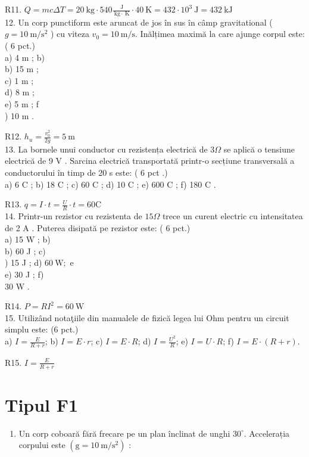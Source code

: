 R11. $Q=m c \Delta T=20 \mathrm{~kg} \cdot 540 \frac{\mathrm{~J}}{\mathrm{~kg} \cdot \mathrm{~K}} \cdot 40 \mathrm{~K}=432 \cdot 10^{3} \mathrm{~J}=432 \mathrm{~kJ}$\\
12. Un corp punctiform este aruncat de jos în sus în câmp gravitational ( $g=10 \mathrm{~m} / \mathrm{s}^{2}$ ) cu viteza $v_{0}=10 \mathrm{~m} / \mathrm{s}$. Inălțimea maximă la care ajunge corpul este: ( 6 pct.)\\
a) 4 m ; b)\\
b) 15 m ;\\
c) 1 m ;\\
d) 8 m ;\\
e) 5 m ; f\\
) 10 m .

R12. $h_{u}=\frac{v_{0}^{2}}{2 g}=5 \mathrm{~m}$\\
13. La bornele unui conductor cu rezistența electrică de $3 \Omega$ se aplică o tensiune electrică de 9 V . Sarcina electrică transportată printr-o secțiune transversală a conductorului în timp de 20 s este: ( 6 pct .)\\
a) 6 C ; b) 18 C ; c) 60 C ; d) 10 C ; e) 600 C ; f) 180 C .

R13. $q=I \cdot t=\frac{U}{R} \cdot t=60 \mathrm{C}$\\
14. Printr-un rezistor cu rezistenta de $15 \Omega$ trece un curent electric cu intensitatea de 2 A . Puterea disipată pe rezistor este: ( 6 pct.)\\
a) 15 W ; b)\\
b) 60 J ; c)\\
) 15 J ; d) $60 \mathrm{~W} ;$ e\\
e) 30 J ; f)\\
30 W .

R14. $P=R I^{2}=60 \mathrm{~W}$\\
15. Utilizând notaţiile din manualele de fizică legea lui Ohm pentru un circuit simplu este: (6 pct.)\\
a) $I=\frac{E}{R+r}$; b) $I=E \cdot r$; c) $I=E \cdot R$; d) $I=\frac{U^{2}}{R}$; e) $I=U \cdot R$; f) $I=E \cdot(R+r)$.

R15. $I=\frac{E}{R+r}$

\section*{Tipul F1}
\begin{enumerate}
  \item Un corp coboară fără frecare pe un plan înclinat de unghi $30^{\circ}$. Accelerația corpului este $\left(\mathrm{g}=10 \mathrm{~m} / \mathrm{s}^{2}\right)$ :
\end{enumerate}


